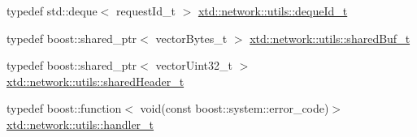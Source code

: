 \begin{DoxyCompactItemize}
\item 
typedef std\+::deque$<$ request\+Id\+\_\+t $>$ \hyperlink{namespacextd_1_1network_1_1utils_ac3ca189267ad1167fa141608f8b3a2de}{xtd\+::network\+::utils\+::deque\+Id\+\_\+t}
\item 
typedef boost\+::shared\+\_\+ptr$<$ vector\+Bytes\+\_\+t $>$ \hyperlink{namespacextd_1_1network_1_1utils_a92b366b7e2a1ab09ac4f4a0401f8fb84}{xtd\+::network\+::utils\+::shared\+Buf\+\_\+t}
\item 
typedef boost\+::shared\+\_\+ptr$<$ vector\+Uint32\+\_\+t $>$ \hyperlink{namespacextd_1_1network_1_1utils_af5b287652a0fd8fca54642f8d3ca07fa}{xtd\+::network\+::utils\+::shared\+Header\+\_\+t}
\item 
typedef boost\+::function$<$ void(const boost\+::system\+::error\+\_\+code)$>$ \hyperlink{namespacextd_1_1network_1_1utils_ac8a6f796cd645f83cde023d163665bb5}{xtd\+::network\+::utils\+::handler\+\_\+t}
\end{DoxyCompactItemize}
